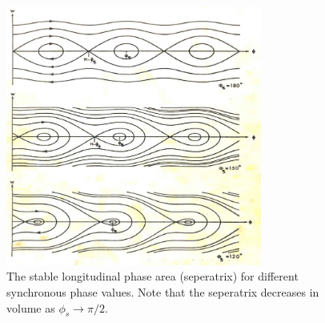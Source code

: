 \begin{figure}
\begin{center}
\includegraphics[width=0.75\textwidth]{Appendices/figures/longPhaseDiag.png}
\end{center}
\caption{The stable longitudinal phase area (seperatrix) for different synchronous phase values. Note that the seperatrix decreases in volume as $\phi_{s} \rightarrow \pi / 2$.}
\label{fig:longSynFreq}
\end{figure}